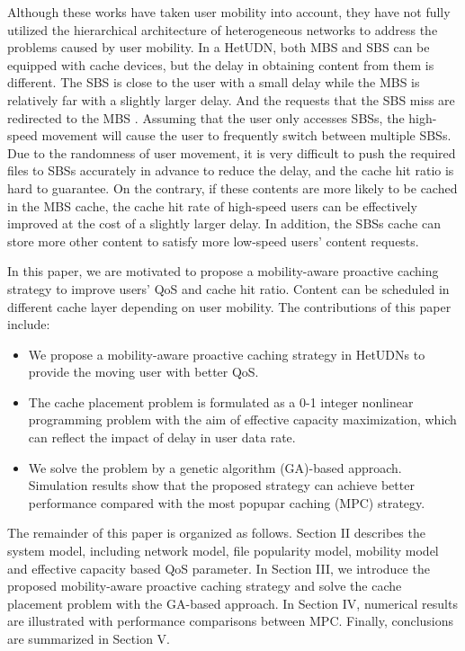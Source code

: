 \documentclass[conference]{IEEEtran}
\begin{document}
Although these works have taken user mobility into account, they have not fully utilized the hierarchical architecture of heterogeneous networks to address the problems caused by user mobility. In a HetUDN, both MBS and SBS can be equipped with cache devices, but the delay in obtaining content from them is different. The SBS is close to the user with a small delay while the MBS is relatively far with a slightly larger delay. And the requests that the SBS miss are redirected to the MBS \cite{7484297}. Assuming that the user only accesses SBSs, the high-speed movement will cause the user to frequently switch between multiple SBSs. Due to the randomness of user movement, it is very difficult to push the required files to SBSs accurately in advance to reduce the delay, and the cache hit ratio is hard to guarantee. On the contrary, if these contents are more likely to be cached in the MBS cache, the cache hit rate of high-speed users can be effectively improved at the cost of a slightly larger delay. In addition, the SBSs cache can store more other content to satisfy more low-speed users' content requests.

In this paper, we are motivated to propose a mobility-aware proactive caching strategy to improve users’ QoS and cache hit ratio. Content can be scheduled in different cache layer depending on user mobility. The contributions of this paper include:

\begin{itemize}
 \item We propose a mobility-aware proactive caching strategy in HetUDNs to provide the moving user with better QoS.
 \item The cache placement problem is formulated as a 0-1 integer nonlinear programming problem with the aim of effective capacity maximization, which can reflect the impact of delay in user data rate.
 \item We solve the problem by a genetic algorithm (GA)-based approach. Simulation results show that the proposed strategy can achieve better performance compared with the most popupar caching (MPC) strategy.
\end{itemize}

The remainder of this paper is organized as follows. Section II describes the system model, including network model, file popularity model, mobility model and effective capacity based QoS parameter. In Section III, we introduce the proposed mobility-aware proactive caching strategy and solve the cache placement problem with the GA-based approach. In Section IV, numerical results are illustrated with performance comparisons between MPC. Finally, conclusions are summarized in Section V.
\end{document}
